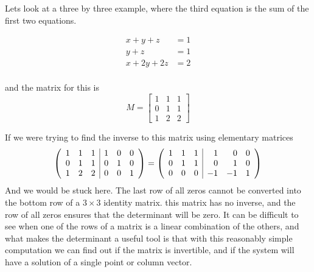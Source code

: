 {Lets look at a three by three example, where the third equation is the sum of the first two equations.

\begin{align*}
x+y + z &= 1\\
y +z &= 1\\
x + 2y+ 2z &= 2\\
\end{align*}

and the matrix for this is 
\[
M =\begin{bmatrix}
1 & 1 &1\\
0 & 1 & 1\\
1 & 2& 2 
\end{bmatrix}
\]

If we were trying to find the inverse to this matrix using elementary matrices
\[ \left( \begin{array}{ccc | ccc}
1 & 1 &1 & 	1 & 0 & 0\\
0 & 1 & 1 & 	0 & 1 & 0 \\
1 & 2 & 2 &	0 & 0 & 1
\end{array} \right) 
=
 \left( \begin{array}{ccc | rrr}
1 & 1 &1 & 	1 & 0 & 0\\
0 & 1 & 1 & 	0 & 1 & 0 \\
0 & 0 & 0 &	-1 & -1 & 1
\end{array} \right) 
\]
And we would be stuck here. The last row of all zeros cannot be converted into the bottom row of a $3 \times 3$ identity matrix. this matrix has no inverse, and the row of all zeros ensures that the determinant will be zero. It can be difficult to see when one of the rows of a matrix is a linear combination of the others, and what makes the determinant a useful tool is that with this reasonably simple computation we can find out if the matrix is invertible, and if the system will have a solution of a single point or column vector. 
} %

